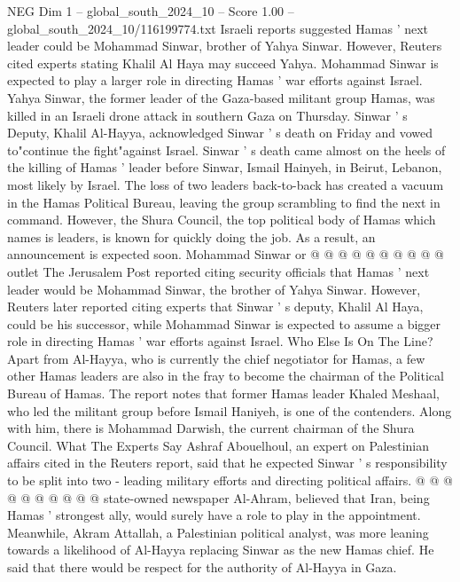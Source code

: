 \begin{textsample}{NEG Dim 1 – global\_south\_2024\_10 – Score 1.00 – global\_south\_2024\_10/116199774.txt}  \label{ex:f1_neg_283}
Israeli reports suggested Hamas ' next leader could be Mohammad Sinwar, brother of Yahya Sinwar.
However, Reuters cited experts stating Khalil Al Haya may succeed Yahya.
Mohammad Sinwar is expected to play a larger role in directing Hamas ' war efforts against Israel.
Yahya Sinwar, the former leader of the Gaza-based militant group Hamas, was killed in an Israeli drone attack in southern Gaza on Thursday.
Sinwar ' s Deputy, Khalil Al-Hayya, acknowledged Sinwar ' s death on Friday and vowed to"continue the fight"against Israel.
Sinwar ' s death came almost on the heels of the killing of Hamas ' leader before Sinwar, Ismail Hainyeh, in Beirut, Lebanon, most likely by Israel.
The loss of two leaders back-to-back has created a vacuum in the Hamas Political Bureau, leaving the group scrambling to find the next in command.
However, the Shura Council, the top political body of Hamas which names is leaders, is known for quickly doing the job.
As a result, an announcement is expected soon.
Mohammad Sinwar or @ @ @ @ @ @ @ @ @ @ outlet The Jerusalem Post reported citing security officials that Hamas ' next leader would be Mohammad Sinwar, the brother of Yahya Sinwar.
However, Reuters later reported citing experts that Sinwar ' s deputy, Khalil Al Haya, could be his successor, while Mohammad Sinwar is expected to assume a bigger role in directing Hamas ' war efforts against Israel.
Who Else Is On The Line?
Apart from Al-Hayya, who is currently the chief negotiator for Hamas, a few other Hamas leaders are also in the fray to become the chairman of the Political Bureau of Hamas.
The report notes that former Hamas leader Khaled Meshaal, who led the militant group before Ismail Haniyeh, is one of the contenders.
Along with him, there is Mohammad Darwish, the current chairman of the Shura Council.
What The Experts Say Ashraf Abouelhoul, an expert on Palestinian affairs cited in the Reuters report, said that he expected Sinwar ' s responsibility to be split into two - leading military efforts and directing political affairs. @ @ @ @ @ @ @ @ @ @ state-owned newspaper Al-Ahram, believed that Iran, being Hamas ' strongest ally, would surely have a role to play in the appointment.
Meanwhile, Akram Attallah, a Palestinian political analyst, was more leaning towards a likelihood of Al-Hayya replacing Sinwar as the new Hamas chief.
He said that there would be respect for the authority of Al-Hayya in Gaza.

\end{textsample}
